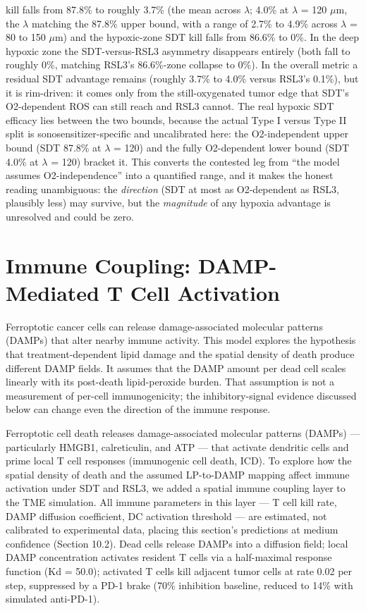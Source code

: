 \documentclass[11pt,twoside,openright]{report}
\begin{document}
kill falls from 87.8\% to roughly 3.7\% (the mean across $\lambda$; 4.0\% at $\lambda$ = 120 $\mu$m, the $\lambda$ matching the 87.8\% upper bound, with a range of 2.7\% to 4.9\% across $\lambda$ = 80 to 150 $\mu$m) and the hypoxic-zone SDT kill falls from 86.6\% to 0\%. In the deep hypoxic zone the SDT-versus-RSL3 asymmetry disappears entirely (both fall to roughly 0\%, matching RSL3's 86.6\%-zone collapse to 0\%). In the overall metric a residual SDT advantage remains (roughly 3.7\% to 4.0\% versus RSL3's 0.1\%), but it is rim-driven: it comes only from the still-oxygenated tumor edge that SDT's O2-dependent ROS can still reach and RSL3 cannot. The real hypoxic SDT efficacy lies between the two bounds, because the actual Type I versus Type II split is sonosensitizer-specific and uncalibrated here: the O2-independent upper bound (SDT 87.8\% at $\lambda$ = 120) and the fully O2-dependent lower bound (SDT 4.0\% at $\lambda$ = 120) bracket it. This converts the contested leg from ``the model assumes O2-independence'' into a quantified range, and it makes the honest reading unambiguous: the \textit{direction} (SDT at most as O2-dependent as RSL3, plausibly less) may survive, but the \textit{magnitude} of any hypoxia advantage is unresolved and could be zero.

\section{Immune Coupling: DAMP-Mediated T Cell Activation}

Ferroptotic cancer cells can release damage-associated molecular patterns (DAMPs) that alter nearby immune activity. This model explores the hypothesis that treatment-dependent lipid damage and the spatial density of death produce different DAMP fields. It assumes that the DAMP amount per dead cell scales linearly with its post-death lipid-peroxide burden. That assumption is not a measurement of per-cell immunogenicity; the inhibitory-signal evidence discussed below can change even the direction of the immune response.

Ferroptotic cell death releases damage-associated molecular patterns (DAMPs) --- particularly HMGB1, calreticulin, and ATP --- that activate dendritic cells and prime local T cell responses (immunogenic cell death, ICD). To explore how the spatial density of death and the assumed LP-to-DAMP mapping affect immune activation under SDT and RSL3, we added a spatial immune coupling layer to the TME simulation. All immune parameters in this layer --- T cell kill rate, DAMP diffusion coefficient, DC activation threshold --- are estimated, not calibrated to experimental data, placing this section's predictions at medium confidence (Section 10.2). Dead cells release DAMPs into a diffusion field; local DAMP concentration activates resident T cells via a half-maximal response function (Kd = 50.0); activated T cells kill adjacent tumor cells at rate 0.02 per step, suppressed by a PD-1 brake (70\% inhibition baseline, reduced to 14\% with simulated anti-PD-1).
\end{document}
